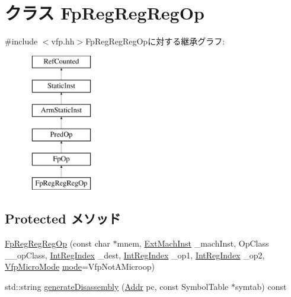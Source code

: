 \hypertarget{classArmISA_1_1FpRegRegRegOp}{
\section{クラス FpRegRegRegOp}
\label{classArmISA_1_1FpRegRegRegOp}
}


{\ttfamily \#include $<$vfp.hh$>$}FpRegRegRegOpに対する継承グラフ:\begin{figure}[H]
\begin{center}
\leavevmode
\includegraphics[height=6cm]{classArmISA_1_1FpRegRegRegOp}
\end{center}
\end{figure}
\subsection*{Protected メソッド}
\begin{DoxyCompactItemize}
\item 
\hyperlink{classArmISA_1_1FpRegRegRegOp_aaa9088e2711d2effd34d465b53be6135}{FpRegRegRegOp} (const char $\ast$mnem, \hyperlink{classStaticInst_a5605d4fc727eae9e595325c90c0ec108}{ExtMachInst} \_\-machInst, OpClass \_\-\_\-opClass, \hyperlink{namespaceArmISA_ae64680ba9fb526106829d6bf92fc791b}{IntRegIndex} \_\-dest, \hyperlink{namespaceArmISA_ae64680ba9fb526106829d6bf92fc791b}{IntRegIndex} \_\-op1, \hyperlink{namespaceArmISA_ae64680ba9fb526106829d6bf92fc791b}{IntRegIndex} \_\-op2, \hyperlink{namespaceArmISA_ad386ea556acd7cd538c64e2d73933714}{VfpMicroMode} \hyperlink{namespaceArmISA_a5f3b9b97eb2dfa29d33e74878455f90d}{mode}=VfpNotAMicroop)
\item 
std::string \hyperlink{classArmISA_1_1FpRegRegRegOp_a95d323a22a5f07e14d6b4c9385a91896}{generateDisassembly} (\hyperlink{classm5_1_1params_1_1Addr}{Addr} pc, const SymbolTable $\ast$symtab) const 
\end{DoxyCompactItemize}
